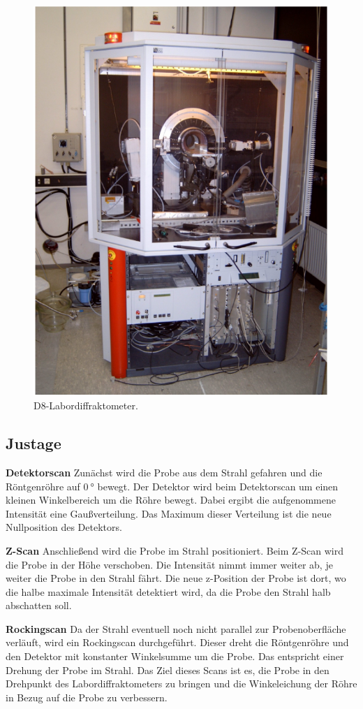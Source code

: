 \begin{figure}
    \centering
    \includegraphics[width=0.5\linewidth]{./figures/D8.png}
    \caption{D8-Labordiffraktometer. \cite{anleitung}}
    \label{fig:D8}
\end{figure}



\subsection{Justage}
\textbf{Detektorscan}
\newline
Zunächst wird die Probe aus dem Strahl gefahren und die Röntgenröhre auf $\SI{0}{\degree}$ bewegt. Der Detektor wird beim Detektorscan um einen kleinen Winkelbereich um die Röhre bewegt. Dabei ergibt die aufgenommene Intensität eine Gaußverteilung. Das Maximum dieser Verteilung ist die neue Nullposition des Detektors.

\textbf{Z-Scan}
\newline
Anschließend wird die Probe im Strahl positioniert. Beim Z-Scan wird die Probe in der Höhe verschoben. Die Intensität nimmt immer weiter ab, je weiter die Probe in den Strahl fährt. Die neue z-Position der Probe ist dort, wo die halbe maximale Intensität detektiert wird, da die Probe den Strahl halb abschatten soll.

\textbf{Rockingscan}
\newline
Da der Strahl eventuell noch nicht parallel zur Probenoberfläche verläuft, wird ein Rockingscan durchgeführt. Dieser dreht die Röntgenröhre und den Detektor mit konstanter Winkelsumme um die Probe. Das entspricht einer Drehung der Probe im Strahl. Das Ziel dieses Scans ist es, die Probe in den Drehpunkt des Labordiffraktometers zu bringen und die Winkeleichung der Röhre in Bezug auf die Probe zu verbessern.


